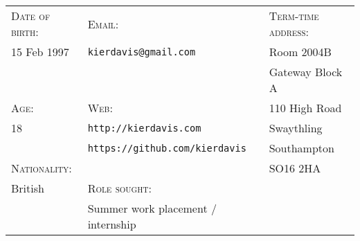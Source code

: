 \hrulefill
\vspace{1.1em}

{
\newcommand{\h}[1]{\textsc{#1}:}
\newcommand{\n}[1]{\hspace{.8em} #1}
\begin{tabu} to \textwidth {X[1,l] X[2,l] X[1.5,l]}
    \h{Date of birth}  & \h{Email}                                 & \h{Term-time address} \\
    \n{15 Feb 1997}    & \n{\texttt{kierdavis@gmail.com}}          & \n{Room 2004B}        \\
                       &                                           & \n{Gateway Block A}   \\
    \h{Age}            & \h{Web}                                   & \n{110 High Road}     \\
    \n{18}             & \n{\texttt{http://kierdavis.com}}         & \n{Swaythling}        \\
                       & \n{\texttt{https://github.com/kierdavis}} & \n{Southampton}       \\
    \h{Nationality}    &                                           & \n{SO16 2HA}          \\
    \n{British}        & \h{Role sought}                           &                       \\
                       & \n{Summer work placement / internship}    &                       \\
\end{tabu}
}

\hrulefill
